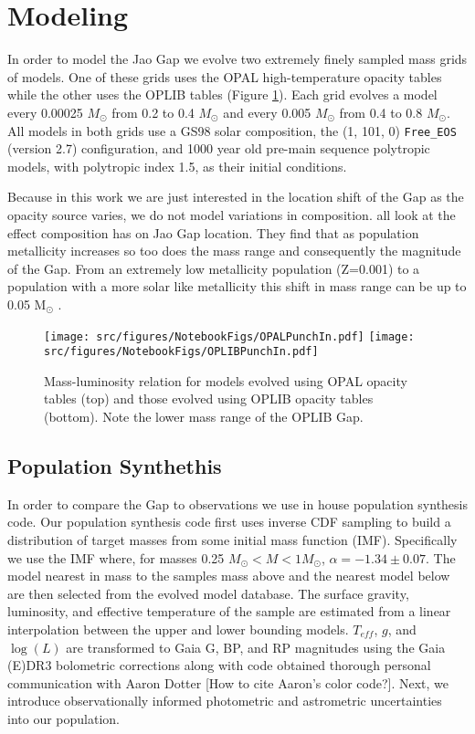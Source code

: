 \section{Modeling}\label{sec:modeling}
In order to model the Jao Gap we evolve two extremely finely sampled mass grids
of models. One of these grids uses the OPAL high-temperature opacity tables
while the other uses the OPLIB tables (Figure \ref{fig:PunchIn}). Each grid
evolves a model every 0.00025 $M_{\odot}$ from 0.2 to 0.4 $M_{\odot}$ and every
0.005 $M_{\odot}$ from 0.4 to 0.8 $M_{\odot}$. All models in both grids use a
GS98 solar composition, the (1, 101, 0) \texttt{Free\_EOS} (version
{\color{red}2.7}) configuration, and 1000 year old pre-main sequence polytropic
models, with polytropic index 1.5, as their initial conditions.

Because in this work we are just interested in the location shift of the Gap as
the opacity source varies, we do not model variations in composition.
\citet{Mansfield2021,Jao2020,Feiden2021} all look at the effect composition has
on Jao Gap location. They find that as population metallicity increases so too
does the mass range and consequently the magnitude of the Gap. From an extremely
low metallicity population (Z=0.001) to a population with a more solar like
metallicity this shift in mass range can be up to 0.05 M$_{\odot}$
\citep{Mansfield2021}.

\begin{figure}
	\centering
	\texttt{[image: src/figures/NotebookFigs/OPALPunchIn.pdf]}
	\texttt{[image: src/figures/NotebookFigs/OPLIBPunchIn.pdf]}
	\caption{Mass-luminosity relation for models evolved using OPAL opacity
	tables (top) and those evolved using OPLIB opacity tables (bottom). Note
	the lower mass range of the OPLIB Gap.}
	\label{fig:PunchIn}
		
\end{figure}

\subsection{Population Synthethis}
In order to compare the Gap to observations we use in house population
synthesis code. Our population synthesis code first uses inverse CDF sampling
to build a distribution of target masses from some initial mass function (IMF).
Specifically we use the \citet{Sollima2019} IMF where, for masses 0.25
$M_{\odot} < M < 1 M_{\odot}$, $\alpha=-1.34\pm0.07$. The model nearest in mass
to the samples mass above and the nearest model below are then selected from
the evolved model database. The surface gravity, luminosity, and effective
temperature of the sample are estimated from a linear interpolation between the
upper and lower bounding models. $T_{eff}$, $g$, and $\log(L)$ are transformed
to Gaia G, BP, and RP magnitudes using the Gaia (E)DR3 bolometric corrections
\citep{Creevey2022} along with code obtained thorough personal communication
with Aaron Dotter {\color{red}[How to cite Aaron's color code?]}. Next, we
introduce observationally informed photometric and astrometric uncertainties
into our population.

